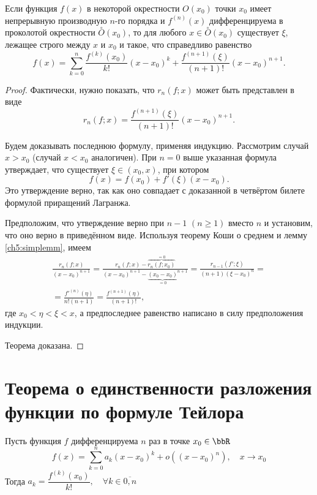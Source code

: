 \begin{thm}
Если функция $f(x)$ в некоторой окрестности $O(x_0)$ точки $x_0$ имеет непрерывную производную $n$-го порядка и $f^{(n)}(x)$ дифференцируема в проколотой окрестности $\overset{\circ}{O}(x_0)$, то для любого
$x \in \overset{\circ}{O}(x_0)$ существует $\xi$, лежащее строго между $x$ и $x_0$ и такое, что справедливо равенство
\begin{equation}
f(x) = \sum_{k = 0}^{n} \frac{f^{(k)}(x_0)}{k!}(x - x_0)^k + \frac{f^{(n + 1)}(\xi)}{(n + 1)!}(x - x_0)^{n + 1}.
\end{equation}
\end{thm}

\begin{proof}
Фактически, нужно показать, что $r_n(f;x)$ может быть представлен в виде
$$
r_n(f;x) = \frac{f^{(n + 1)}(\xi)}{(n + 1)!}(x - x_0)^{n + 1}.
$$

Будем доказывать последнюю формулу, применяя индукцию. Рассмотрим случай $x>x_0$ (случай $x<x_0$ аналогичен). При $n=0$ выше указанная формула утверждает, что существует $\xi\in(x_0,x)$, при котором
$$
f(x) = f(x_0) + f'(\xi)(x-x_0).
$$
Это утверждение верно, так как оно совпадает с доказанной в четвёртом билете формулой приращений Лагранжа.

Предположим, что утверждение верно при $n-1$ $(n \ge 1)$ вместо $n$ и установим, что оно верно в приведённом виде. Используя теорему Коши о среднем и лемму \ref{ch5:simplemm}, имеем
\begin{multline*}
\frac{r_n(f;x)}{(x-x_0)^{n+1}} = \frac{r_n(f;x) - \overbrace{r_n(f;x_0)}^{=0}}{(x-x_0)^{n+1} - {\underbrace{(x_0-x_0)}_{=0}}^{n+1}} = \frac{r_{n-1}(f';\xi)}{(n+1)(\xi-x_0)^{n}} =\\ 
= \frac{{f'}^{(n)} (\eta)}{n!(n+1)} =  \frac{{f}^{(n+1)} (\eta)}{(n+1)!},
\end{multline*}
где $x_0<\eta<\xi<x$, а предпоследнее равенство написано в силу предположения индукции.

Теорема доказана.
\end{proof}

\section{Теорема о единственности разложения функции по формуле Тейлора}

\begin{thm}
Пусть функция $f$ дифференцируема $n$ раз в точке $x_0 \in \bbR$
\begin{equation} \label{ch5.3.eq3}
f(x) = \sum_{k = 0}^{n}a_k (x - x_0)^k + o((x - x_0)^n), \quad x \to x_0 
\end{equation}
Тогда $a_k = \dfrac{f^{(k)}(x_0)}{k!}, \quad \forall k \in \overline{0, n}$
\end{thm}

